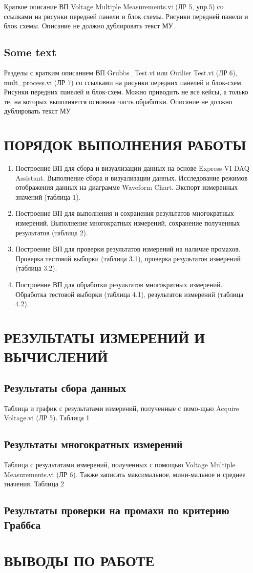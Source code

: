 \documentclass[a4paper,14pt]{article}
\begin{document}
Краткое описание ВП Voltage Multiple Measurements.vi (ЛР 5, упр.5) со ссылками на рисунки передней панели и блок схемы. Рисунки передней панели и блок схемы. Описание не должно дублировать текст МУ.

\subsection{Some text}
Разделы с кратким описанием ВП Grubbs\_Test.vi или Outlier Test.vi (ЛР 6), mult\_process.vi (ЛР 7) со ссылками на рисунки передних панелей и блок-схем. Рисунки передних панелей и блок-схем. Можно приводить не все кейсы, а только те, на которых выполняется основная часть обработки. Описание не должно дублировать текст МУ 

\section{ПОРЯДОК ВЫПОЛНЕНИЯ РАБОТЫ}
\begin{enumerate}
\item 	Построение ВП для сбора и визуализации данных на основе Express-VI DAQ Assistant.
 Выполнение сбора и визуализации данных. 
 Исследование режимов отображения данных на диаграмме Waveform Chart. 
 Экспорт измеренных значений (таблица 1).
\item 	Построение ВП для выполнения и сохранения результатов многократных измерений.
 Выполнение многократных измерений, сохранение полученных результатов (таблица 2).
\item 	Построение ВП для проверки результатов измерений на наличие промахов. 
Проверка тестовой выборки (таблица 3.1), проверка результатов измерений (таблица  3.2).
\item 	Построение ВП для обработки результатов многократных измерений. 
Обработка тестовой выборки (таблица 4.1), результатов измерений (таблица 4.2).
\end{enumerate}

\section{ РЕЗУЛЬТАТЫ ИЗМЕРЕНИЙ И ВЫЧИСЛЕНИЙ}

\subsection{Результаты сбора данных}
Таблица и график с результатами измерений, полученные с помо-щью Acquire Voltage.vi (ЛР 5). 
Таблица 1
\subsection{Результаты многократных измерений}

Таблица с результатами измерений, полученных с помощью Voltage Multiple Measurements.vi (ЛР 6). Также записать максимальное, мини-мальное и среднее значения. 
Таблица 2
\subsection{Результаты проверки на промахи по критерию Граббса}

\section{ВЫВОДЫ ПО РАБОТЕ}
\end{document}
